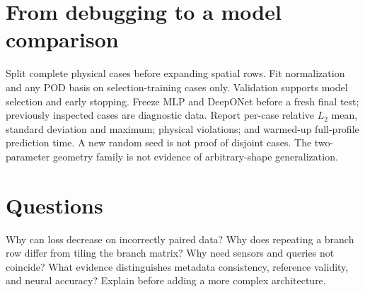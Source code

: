 \documentclass[11pt]{article}
\begin{document}
\section*{From debugging to a model comparison}
Split complete physical cases before expanding spatial rows. Fit normalization
and any POD basis on selection-training cases only. Validation supports model
selection and early stopping. Freeze MLP and DeepONet before a fresh final test;
previously inspected cases are diagnostic data. Report per-case relative
$L_2$ mean, standard deviation and maximum; physical violations; and warmed-up
full-profile prediction time. A new random seed is not proof of disjoint cases.
The two-parameter geometry family is not evidence of arbitrary-shape generalization.
\section*{Questions}
Why can loss decrease on incorrectly paired data? Why does repeating a branch
row differ from tiling the branch matrix? Why need sensors and queries not
coincide? What evidence distinguishes metadata consistency, reference validity,
and neural accuracy? Explain before adding a more complex architecture.
\end{document}
